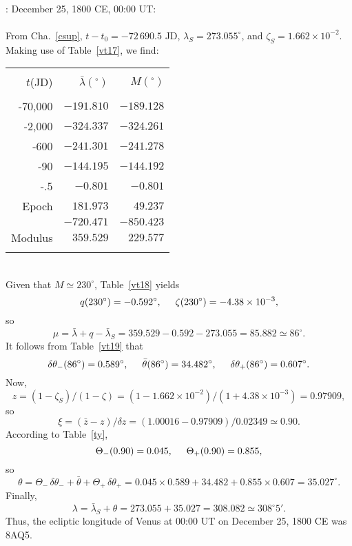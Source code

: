 ~\\
: December 25,  1800 CE, 00:00 UT:\\
~\\
From Cha.~\ref{csup}, $t-t_0=-72\,690.5$ JD, $\lambda_S= 273.055^\circ$, and $\zeta_S= 1.662\times 10^{-2}$. Making use of
Table~\ref{vt17}, we find:\\
\begin{tabular}{rrr}
&&\\
$t$(JD) & $\bar{\lambda}(^\circ)$ & $ M(^\circ)$\\[-2ex]
&&\\
-70,000 & $-191.810$ & $-189.128$\\
-2,000 & $-324.337$ & $-324.261$\\
-600 & $-241.301$ & $-241.278$\\
-90 & $-144.195$ & $-144.192$\\
-.5 & $-0.801$ & $-0.801$\\
Epoch & $181.973$ & $49.237$\\\cline{2-3}
&$-720.471$ & $-850.423$\\\cline{2-3}
Modulus & $359.529$ & $229.577$\\
&&\\
\end{tabular}\\
Given that $M\simeq 230^\circ$, Table~\ref{vt18} yields 
$$
q(230^\circ)= -0.592^\circ,\mbox{\hspace{0.5cm}}\zeta(230^\circ)=-4.38\times 10^{-3},
$$
so
$$
\mu=\bar{\lambda}+q-\bar{\lambda}_S =359.529-0.592-273.055= 85.882\simeq 86^\circ.
$$
It follows from Table~\ref{vt19}
that 
$$
\delta\theta_-(86^\circ) = 0.589^\circ, \mbox{\hspace{0.5cm}}\bar{\theta}(86^\circ)=34.482^\circ, \mbox{\hspace{0.5cm}}\delta\theta_+(86^\circ) = 0.607^\circ.
$$
 Now, 
 $$
 z= (1-\zeta_S)/(1-\zeta) = (1-1.662\times 10^{-2})/(1+4.38\times 10^{-3}) =
0.97909,
$$
so
$$
\xi = (\bar{z}-z)/\delta z = (1.00016-0.97909)/0.02349 \simeq 0.90.
$$
According to Table~\ref{ty}, 
$$
\Theta_-(0.90) = 0.045,\mbox{\hspace{0.5cm}}\Theta_+(0.90) = 0.855,
$$
so
$$
\theta  = \Theta_-\,\delta\theta_- + \bar{\theta}+\Theta_+\,\delta\theta_+ = 0.045\times 0.589+34.482+0.855\times 0.607 = 35.027^\circ.
$$
Finally,
$$
\lambda=\bar{\lambda}_S  + \theta= 273.055+35.027= 308.082 \simeq 308^\circ 5'.
$$
Thus,
the ecliptic longitude of Venus at 00:00 UT on December 25, 1800 CE was 8AQ5.

